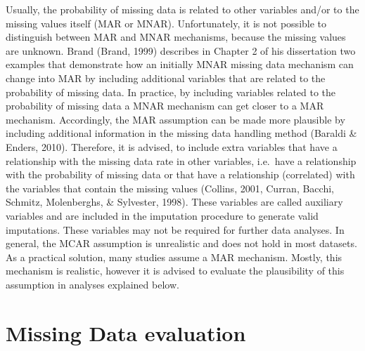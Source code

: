 \documentclass[]{book}
\theoremstyle{definition}
\theoremstyle{definition}
\theoremstyle{definition}
\theoremstyle{remark}
\begin{document}
Usually, the probability of missing data is related to other variables
and/or to the missing values itself (MAR or MNAR). Unfortunately, it is
not possible to distinguish between MAR and MNAR mechanisms, because the
missing values are unknown. Brand (Brand, 1999) describes in Chapter 2
of his dissertation two examples that demonstrate how an initially MNAR
missing data mechanism can change into MAR by including additional
variables that are related to the probability of missing data. In
practice, by including variables related to the probability of missing
data a MNAR mechanism can get closer to a MAR mechanism. Accordingly,
the MAR assumption can be made more plausible by including additional
information in the missing data handling method (Baraldi \& Enders,
2010). Therefore, it is advised, to include extra variables that have a
relationship with the missing data rate in other variables, i.e.~have a
relationship with the probability of missing data or that have a
relationship (correlated) with the variables that contain the missing
values (Collins, 2001, Curran, Bacchi, Schmitz, Molenberghs, \&
Sylvester, 1998). These variables are called auxiliary variables and are
included in the imputation procedure to generate valid imputations.
These variables may not be required for further data analyses. In
general, the MCAR assumption is unrealistic and does not hold in most
datasets. As a practical solution, many studies assume a MAR mechanism.
Mostly, this mechanism is realistic, however it is advised to evaluate
the plausibility of this assumption in analyses explained below.

\section{Missing Data evaluation}\label{missing-data-evaluation-1}
\end{document}
